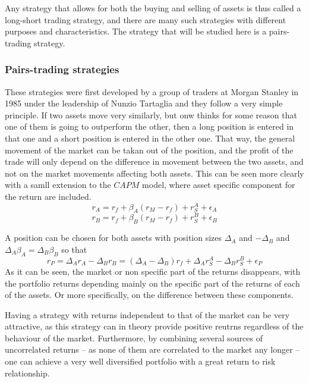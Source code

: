 Any strategy that allows for both the buying and selling of assets is thus called a long-short trading strategy, and there are many such strategies with different purposes and characteristics. The strategy that will be studied here is a pairs-trading strategy.
\subsubsection{Pairs-trading strategies}
These strategies were first developed by a group of traders at Morgan Stanley in 1985 under the leadership of Nunzio Tartaglia and they follow a very simple principle. If two assets move very similarly, but onw thinks for some reason that one of them is going to outperform the other, then a long position is entered in that one and a short position is entered in the other one. That way, the general movement of the market can be takan out of the position, and the profit of the trade will only depend on the difference in movement between the two assets, and not on the market movements affecting both assets. 
This can be seen more clearly with a samll extension to the $CAPM$ model, where asset specific component for the return are included.
\begin{equation}
    r_A=r_f+\beta_A(r_M-r_f)+ r_S^A+ \epsilon_A
\end{equation}
\begin{equation}
    r_B=r_f+\beta_B(r_M-r_f)+ r_S^B+ \epsilon_B
\end{equation}


A position can be chosen for both assets with position sizes $\Delta_A$ and $-\Delta_B$ and $\Delta_A\beta_A=\Delta_B\beta_B$ so that
\begin{equation}
    r_P=\Delta_Ar_A-\Delta_Br_B=(\Delta_A-\Delta_B)r_f + \Delta_A r_S^A - \Delta_B r_S^B + \epsilon_P
\end{equation}
As it can be seen, the market or non specific part of the returns disappears, with the portfolio returns depending mainly on the specific part of the returns of each of the assets. Or more specifically, on the difference between these components. 

Having a strategy with returns independent to that of the market can be very attractive, as this strategy can in theory provide positive reutrns regardless of the behaviour of the market. Furthermore, by combining several sources of uncorrelated returns -- as none of them are correlated to the market any longer -- one can achieve a very well diversified portfolio with a great return to risk relationship. 

